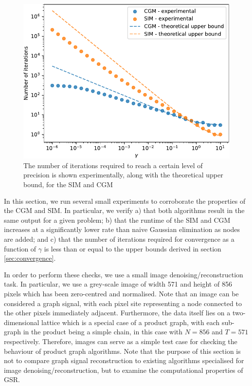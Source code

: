 \begin{figure}[t]
    \hypertarget{complexity}{}
    \label{fig:complexity}
    \begin{center}
        \includegraphics[width=0.7\linewidth]{Figures/complexity.pdf}
    \end{center}
    \caption{\small{The number of iterations required to reach a certain level of precision is shown experimentally, along with the theoretical upper bound, for the SIM and CGM} }
\end{figure}




In this section, we run several small experiments to corroborate the properties of the CGM and SIM. In particular, we verify a) that both algorithms result in the same output for a given problem; b) that the runtime of the SIM and CGM increases at a significantly lower rate than naive Gaussian elimination as nodes are added; and c) that the number of iterations required for convergence as a function of $\gamma$ is less than or equal to the upper bounds derived in section \ref{sec:convergence}.

In order to perform these checks, we use a small image denoising/reconstruction task. In particular, we use a grey-scale image of width 571 and height of 856 pixels which has been zero-centred and normalised. Note that an image can be considered a graph signal, with each pixel site representing a node connected to the other pixels immediately adjacent. Furthermore, the data itself lies on a two-dimensional lattice which is a special case of a product graph, with each sub-graph in the product being a simple chain, in this case with $N=856$ and $T=571$ respectively. Therefore, images can serve as a simple test case for checking the behaviour of product graph algorithms. Note that the purpose of this section is not to compare graph signal reconstruction to existing algorithms specialised for image denoising/reconstruction, but to examine the computational properties of GSR.

